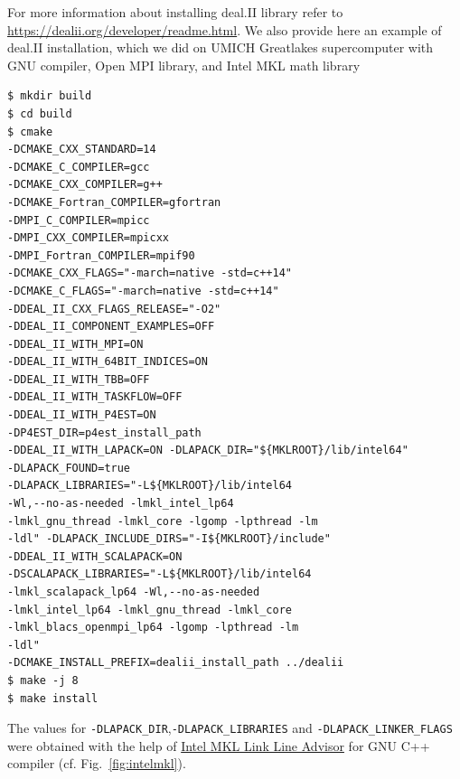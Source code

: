  For more information about installing deal.II library refer to \url{https://dealii.org/developer/readme.html}. We also provide here an example of deal.II installation, which we did on UMICH Greatlakes supercomputer with GNU compiler, Open MPI library, and Intel MKL math library
\begin{verbatim}
$ mkdir build
$ cd build
$ cmake
-DCMAKE_CXX_STANDARD=14
-DCMAKE_C_COMPILER=gcc 
-DCMAKE_CXX_COMPILER=g++
-DCMAKE_Fortran_COMPILER=gfortran
-DMPI_C_COMPILER=mpicc 
-DMPI_CXX_COMPILER=mpicxx 
-DMPI_Fortran_COMPILER=mpif90
-DCMAKE_CXX_FLAGS="-march=native -std=c++14"
-DCMAKE_C_FLAGS="-march=native -std=c++14"
-DDEAL_II_CXX_FLAGS_RELEASE="-O2"
-DDEAL_II_COMPONENT_EXAMPLES=OFF
-DDEAL_II_WITH_MPI=ON
-DDEAL_II_WITH_64BIT_INDICES=ON
-DDEAL_II_WITH_TBB=OFF
-DDEAL_II_WITH_TASKFLOW=OFF 
-DDEAL_II_WITH_P4EST=ON 
-DP4EST_DIR=p4est_install_path 
-DDEAL_II_WITH_LAPACK=ON -DLAPACK_DIR="${MKLROOT}/lib/intel64"
-DLAPACK_FOUND=true
-DLAPACK_LIBRARIES="-L${MKLROOT}/lib/intel64
-Wl,--no-as-needed -lmkl_intel_lp64
-lmkl_gnu_thread -lmkl_core -lgomp -lpthread -lm
-ldl" -DLAPACK_INCLUDE_DIRS="-I${MKLROOT}/include" 
-DDEAL_II_WITH_SCALAPACK=ON
-DSCALAPACK_LIBRARIES="-L${MKLROOT}/lib/intel64
-lmkl_scalapack_lp64 -Wl,--no-as-needed
-lmkl_intel_lp64 -lmkl_gnu_thread -lmkl_core
-lmkl_blacs_openmpi_lp64 -lgomp -lpthread -lm
-ldl"
-DCMAKE_INSTALL_PREFIX=dealii_install_path ../dealii
$ make -j 8
$ make install
\end{verbatim}
The values for \verb|-DLAPACK_DIR|,\verb|-DLAPACK_LIBRARIES| and \verb|-DLAPACK_LINKER_FLAGS| were obtained with the help of \href{https://software.intel.com/en-us/articles/intel-mkl-link-line-advisor}{Intel MKL Link Line Advisor} for GNU C++ compiler (cf. Fig.~\ref{fig:intelmkl}).\\ 
